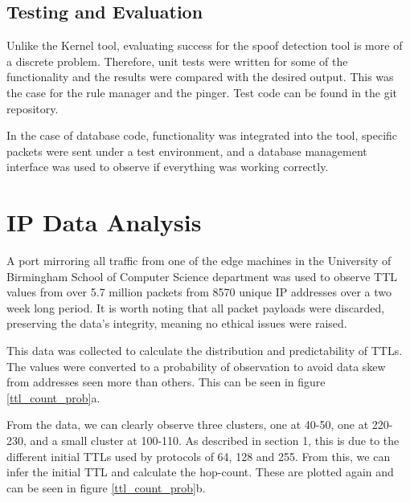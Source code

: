 \documentclass[12pt,twoside]{article}
\begin{document}
\subsection{Testing and Evaluation}
Unlike the Kernel tool, evaluating success for the spoof detection tool is more of a discrete problem. Therefore, unit tests were written for some of the functionality and the results were compared with the desired output. This was the case for the rule manager and the pinger. Test code can be found in the git repository. 

In the case of database code, functionality was integrated into the tool, specific packets were sent under a test environment, and a database management interface was used to observe if everything was working correctly.


\section{IP Data Analysis} \label{analysis}
A port mirroring all traffic from one of the edge machines in the University of Birmingham School of Computer Science department was used to observe TTL values from over 5.7 million packets from 8570 unique IP addresses over a two week long period. It is worth noting that all packet payloads were discarded, preserving the data's integrity, meaning no ethical issues were raised.

This data was collected to calculate the distribution and predictability of TTLs. The values were converted to a probability of observation to avoid data skew from addresses seen more than others. This can be seen in figure \ref{ttl_count_prob}a. 

From the data, we can clearly observe three clusters, one at 40-50, one at 220-230, and a small cluster at 100-110. As described in section 1, this is due to the different initial TTLs used by protocols of 64, 128 and 255. From this, we can infer the initial TTL and calculate the hop-count. These are plotted again and can be seen in figure \ref{ttl_count_prob}b. 
\end{document}
